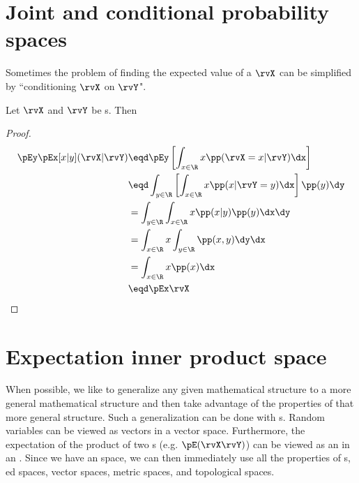 \section{Joint and conditional probability spaces}
Sometimes the problem of finding the expected value of a  $\rvX$
can be simplified by ``conditioning $\rvX$ on $\rvY$".
\begin{theorem}
Let $\rvX$ and $\rvY$ be s. Then
\thmbox{\pEx{\rvX} = \pEy\pEx[x|y](\rvX|\rvY) }
\end{theorem}
\begin{proof}
\begin{align*}
   \pEy\pEx[x|y](\rvX|\rvY)
     &\eqd \pEy \left[ \int_{x\in\R}x \pp(\rvX=x|\rvY) \dx \right]
   \\&\eqd \int_{y\in\R} \left[\int_{x\in\R}x \pp(x|\rvY=y) \dx \right] \pp(y) \dy
   \\&=    \int_{y\in\R} \int_{x\in\R}x \pp(x|y)\pp(y) \dx   \dy
   \\&=    \int_{x\in\R}x \int_{y\in\R} \pp(x,y) \dy   \dx
   \\&=    \int_{x\in\R}x \pp(x) \dx
   \\&\eqd \pEx\rvX
\end{align*}
\end{proof}

\section{Expectation inner product space}
When possible, we like to generalize any given mathematical structure
to a more general mathematical structure and then take advantage of
the properties of that more general structure.
Such a generalization can be done with s.
Random variables can be viewed as vectors in a vector space.
Furthermore, the expectation of the product of two s
(e.g. $\pE(\rvX\rvY)$)
can be viewed as an  in an .
Since we have an  space,
we can then immediately use all the properties of
s, ed spaces, vector spaces, metric spaces,
and topological spaces.

